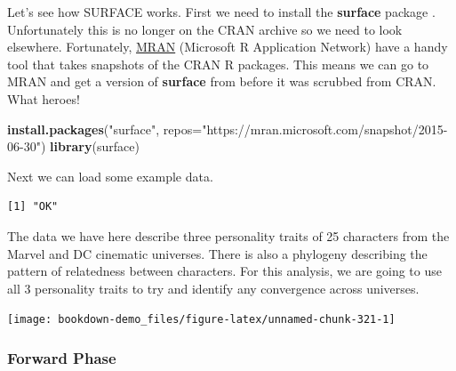 \documentclass[
]{book}
\newenvironment{Shaded}{\begin{snugshade}}{\end{snugshade}}
\newcommand{\DataTypeTok}[1]{\textcolor[rgb]{0.13,0.29,0.53}{#1}}
\newcommand{\KeywordTok}[1]{\textcolor[rgb]{0.13,0.29,0.53}{\textbf{#1}}}
\newcommand{\NormalTok}[1]{#1}
\newcommand{\OperatorTok}[1]{\textcolor[rgb]{0.81,0.36,0.00}{\textbf{#1}}}
\newcommand{\StringTok}[1]{\textcolor[rgb]{0.31,0.60,0.02}{#1}}
\begin{document}
Let's see how SURFACE works. First we need to install the \textbf{surface} package \citep{surface}. Unfortunately this is no longer on the CRAN archive so we need to look elsewhere. Fortunately, \href{https://mran.microsoft.com/}{MRAN} (Microsoft R Application Network) have a handy tool that takes snapshots of the CRAN R packages. This means we can go to MRAN and get a version of \textbf{surface} from before it was scrubbed from CRAN. What heroes!

\begin{Shaded}
\begin{Highlighting}[]
\KeywordTok{install.packages}\NormalTok{(}\StringTok{"surface"}\NormalTok{, }\DataTypeTok{repos=}\StringTok{"https://mran.microsoft.com/snapshot/2015{-}06{-}30"}\NormalTok{)}
\KeywordTok{library}\NormalTok{(surface)}
\end{Highlighting}
\end{Shaded}

Next we can load some example data.

\begin{Shaded}
\end{Shaded}

\begin{verbatim}
[1] "OK"
\end{verbatim}

The data we have here describe three personality traits of 25 characters from the Marvel and DC cinematic universes. There is also a phylogeny describing the pattern of relatedness between characters. For this analysis, we are going to use all 3 personality traits to try and identify any convergence across universes.

\begin{center}\texttt{[image: bookdown-demo\_files/figure-latex/unnamed-chunk-321-1]} \end{center}

\hypertarget{forward-phase}{%
\subsubsection{Forward Phase}\label{forward-phase}}
\end{document}
